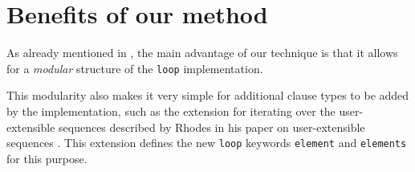 \section{Benefits of our method}
\label{sec-benefits}
 
As already mentioned in , the main advantage
of our technique is that it allows for a \emph{modular} structure of
the \texttt{loop} implementation.

This modularity also makes it very simple for additional clause types
to be added by the \commonlisp{} implementation, such as the extension
for iterating over the user-extensible sequences described by Rhodes
in his paper on user-extensible sequences
\cite{Rhodes:2007:USC:1622123.1622138}.  This extension defines the
new \texttt{loop} keywords \texttt{element} and \texttt{elements} for
this purpose.
